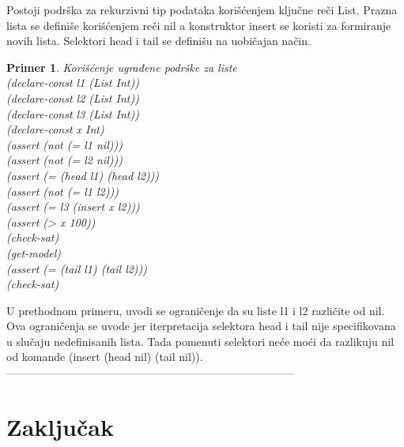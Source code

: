 \documentclass[12pt,oneside]{memoir}
\newtheorem{primer}{Primer}
\begin{document}
Postoji podrška za rekurzivni tip podataka korišćenjem ključne reči List. 
Prazna lista se definiše korišćenjem reči nil a konstruktor insert se koristi za formiranje novih lista. Selektori head i tail se definišu na uobičajan način.
\\
\begin{primer} Korišćenje ugrađene podrške za liste
\\(declare-const l1 (List Int))
\\(declare-const l2 (List Int))
\\(declare-const l3 (List Int))
\\(declare-const x Int)
\\(assert (not (= l1 nil)))
\\(assert (not (= l2 nil)))
\\(assert (= (head l1) (head l2)))
\\(assert (not (= l1 l2)))
\\(assert (= l3 (insert x l2)))
\\(assert (> x 100))
\\(check-sat)
\\(get-model)
\\(assert (= (tail l1) (tail l2)))
\\(check-sat)
\end{primer}

U prethodnom primeru, uvodi se ograničenje da su liste l1 i l2 različite od nil. Ova ograničenja se uvode jer iterpretacija selektora head i tail 
nije specifikovana u slučaju nedefinisanih lista.
Tada pomenuti selektori neće moći da razlikuju nil od komande (insert (head nil) (tail nil)).
------------------------------------------------------------------------------



\chapter{Zaključak}


\literatura

\backmatter
\end{document}
